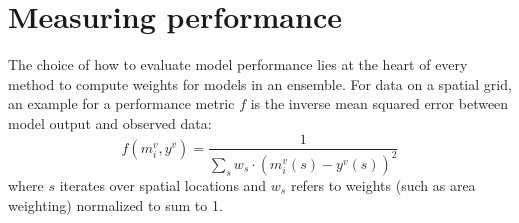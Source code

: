 \section{Measuring performance}\label{sec:likelihoods}

The choice of how to evaluate model performance lies at the heart of every method to compute weights for models in an ensemble.
For data on a spatial grid, an example for a performance metric $f$ is the inverse mean squared error between model output and observed data:
%
\begin{equation}
	f(m_i^v,y^v) = \frac{1}{\sum_{s} w_s \cdot (m^v_i(s) - y^v(s))^2}
\end{equation}
%
where $s$ iterates over spatial locations and $w_s$ refers to weights (such as area weighting) normalized to sum to 1. 


